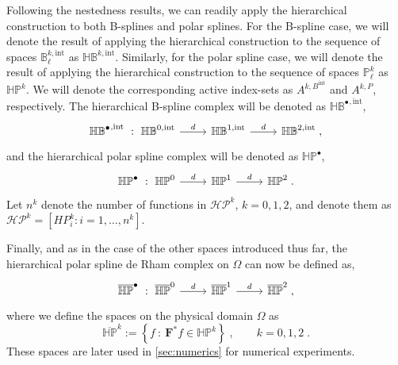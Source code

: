 \documentclass[10pt]{article}
\newcommand{\mbf}[1]{{\boldsymbol{#1}}}
\newcommand{\basis}[1]{\mathcal{#1}}
\newcommand{\vSpace}[1]{\mathbb{#1}}
\newcommand{\complex}[1]{\mathit{\vSpace{#1}^\bullet}}
\newcommand{\bsp}{B}
\newcommand{\bspS}{\vSpace{\bsp}}
\newcommand{\polar}{P}
\newcommand{\polarS}{\vSpace{\polar}}
\newcommand{\tint}{\mathrm{int}}
\newcommand{\polarDomain}{\Omega}
\newcommand{\hSpace}[1]{\mathit{\vSpace{H}\vSpace{#1}}}
\newcommand{\hBasis}[1]{\mathit{\basis{H}\basis{#1}}}
\newcommand{\hbsp}[1]{\mathit{H #1}}
\newcommand{\hpolarComplex}{\complex{H\polar}}
\newcommand{\activeS}[2]{A^{#1}_{#2}}
\theoremstyle{plain}
\theoremstyle{definition}
\theoremstyle{remark}
\begin{document}
Following the nestedness results, we can readily apply the hierarchical construction to both B-splines and polar splines.
For the B-spline case, we will denote the result of applying the hierarchical construction to the sequence of spaces $\bspS^{k,\tint}_{\ell}$ as $\hSpace{\bsp}^{k,\tint}$.
Similarly, for the polar spline case, we will denote the result of applying the hierarchical construction to the sequence of spaces $\polarS^k_\ell$ as $\hSpace{\polar}^k$.
We will denote the corresponding active index-sets as $\activeS{k,\bsp^\tint}{}$ and $\activeS{k,\polar}{}$, respectively.
The hierarchical B-spline complex will be denoted as $\complex{\hSpace{\bsp}}^{,\tint}$,
\begin{equation}
    \begin{tikzcd}
        \complex{\hSpace{\bsp}}^{,\tint}~:~ \hSpace{\bsp}^{0,\tint} \arrow{r}{d} & \hSpace{\bsp}^{1,\tint} \arrow{r}{d} & \hSpace{\bsp}^{2,\tint}\;,
    \end{tikzcd}
\end{equation}
and the hierarchical polar spline complex will be denoted as $\hpolarComplex$,
\begin{equation}
    \begin{tikzcd}
        \hpolarComplex~:~ \hSpace{\polar}^0 \arrow{r}{d} & \hSpace{\polar}^1 \arrow{r}{d} & \hSpace{\polar}^2\;.
    \end{tikzcd}
\end{equation}
Let \(n^k\) denote the number of functions in $\hBasis{\polar}^k$, $k = 0, 1, 2$, and denote them as $\hBasis{\polar}^k = [\hbsp{\polar}^k_i : i = 1, \dots, n^k]$.

Finally, and as in the case of the other spaces introduced thus far, the hierarchical polar spline de Rham complex on $\polarDomain$ can now be defined as,
\begin{equation}
    \begin{tikzcd}
        \complex{\overline{\hSpace{\polar}}}~:~ \overline{\hSpace{\polar}}^{0} \arrow{r}{d} & \overline{\hSpace{\polar}}^{1} \arrow{r}{d} & \overline{\hSpace{\polar}}^{2}\;,
    \end{tikzcd}
\end{equation}
where we define the spaces on the physical domain $\polarDomain$ as
\begin{equation}
    \overline{\hSpace{\polar}}^{k} := \left\{ f ~:~ \mbf{F}^* f  \in \hSpace{\polar}^{k} \right\}\;,\qquad k = 0, 1, 2\;.
\end{equation}
These spaces are later used in \cref{sec:numerics} for numerical experiments.
\end{document}
